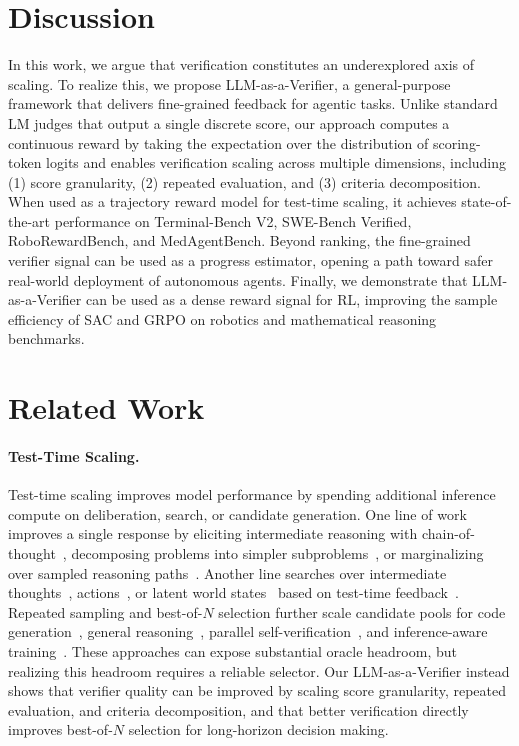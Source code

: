 \section{Discussion}
\label{sec:conclusion}

In this work, we argue that verification constitutes an underexplored axis of scaling. To realize this, we propose LLM-as-a-Verifier, a general-purpose framework that delivers fine-grained feedback for agentic tasks. Unlike standard LM judges that output a single discrete score, our approach computes a continuous reward by taking the expectation over the distribution of scoring-token logits and enables verification scaling across multiple dimensions, including (1) score granularity, (2) repeated evaluation, and (3) criteria decomposition. When used as a trajectory reward model for test-time scaling, it achieves state-of-the-art performance on Terminal-Bench V2, SWE-Bench Verified, RoboRewardBench, and MedAgentBench. Beyond ranking, the fine-grained verifier signal can be used as a progress estimator, opening a path toward safer real-world deployment of autonomous agents. Finally, we demonstrate that LLM-as-a-Verifier can be used as a dense reward signal for RL, improving the sample efficiency of SAC and GRPO on robotics and mathematical reasoning benchmarks.

\clearpage

\section{Related Work}
\label{app:related-work}

\paragraph{Test-Time Scaling.}
Test-time scaling improves model performance by spending additional inference compute on deliberation, search, or candidate generation. One line of work improves a single response by eliciting intermediate reasoning with chain-of-thought~\citep{wei_chain--thought_nodate,kojima2022large}, decomposing problems into simpler subproblems~\citep{zhou2022least}, or marginalizing over sampled reasoning paths~\citep{wang_self-consistency_2023}. Another line searches over intermediate thoughts~\citep{yao2023tree,besta2023graph}, actions~\citep{yao_react_2023,zhou2023language}, or latent world states~\citep{hao2023rap} based on test-time feedback~\citep{weng2022selfverification,madaan_self-refine_nodate,shinn_reflexion_nodate,gou2023critic,agrawal_gepa_2025,novikov_alphaevolve_2025}. Repeated sampling and best-of-$N$ selection further scale candidate pools for code generation~\citep{li2022alphacode}, general reasoning~\citep{brown2024largelanguagemonkeysscaling,snell_scaling_2024}, parallel self-verification~\citep{singh_v_1_2026}, and inference-aware training~\citep{chow2024inferenceaware}. These approaches can expose substantial oracle headroom, but realizing this headroom requires a reliable selector. Our LLM-as-a-Verifier instead shows that verifier quality can be improved by scaling score granularity, repeated evaluation, and criteria decomposition, and that better verification directly improves best-of-$N$ selection for long-horizon decision making.

